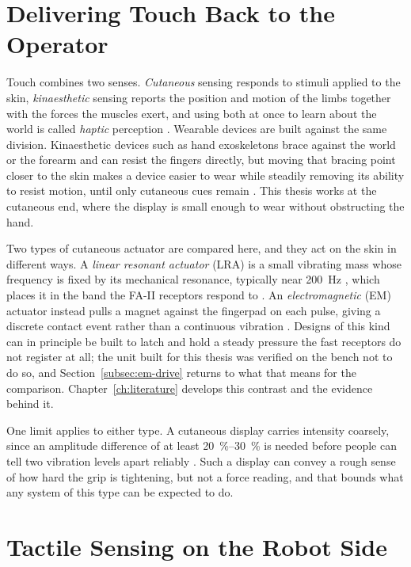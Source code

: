\documentclass[12pt, a4paper, twoside, openright]{report}
\begin{document}
\section{Delivering Touch Back to the Operator}
\label{sec:existing-approaches}

Touch combines two senses. \emph{Cutaneous} sensing
responds to stimuli applied to the skin, \emph{kinaesthetic} sensing reports
the position and motion of the limbs together with the forces the muscles
exert, and using both at once to learn about the world is called \emph{haptic}
perception \cite{howe1992}. Wearable devices are built against the same
division. Kinaesthetic devices such as hand exoskeletons brace against the
world or the forearm and can resist the fingers directly, but moving that
bracing point closer to the skin makes a device easier to wear while steadily
removing its ability to resist motion, until only cutaneous cues remain
\cite{pacchierotti2017}. This thesis works at the cutaneous end, where the
display is small enough to wear without obstructing the hand.

Two types of cutaneous actuator are compared here, and they act on the skin
in different ways. A \emph{linear resonant actuator} (LRA) is a small vibrating
mass whose frequency is fixed by its mechanical resonance, typically near
\SI{200}{\hertz} \cite{choi2013}, which places it in the band the FA-II
receptors respond to \cite{johansson2009}. An \emph{electromagnetic} (EM)
actuator instead pulls a magnet against the fingerpad on each pulse, giving a
discrete contact event rather than a continuous vibration
\cite{johansson2009,vechev2019}. Designs of this kind can in principle be
built to latch and hold a steady pressure the fast receptors do not register at
all; the unit built for this thesis was verified on the bench not to do so, and
Section~\ref{subsec:em-drive} returns to what that means for the comparison.
Chapter~\ref{ch:literature} develops this contrast and the evidence behind it.

One limit applies to either type. A cutaneous display carries intensity
coarsely, since an amplitude difference of at least \SIrange{20}{30}{\percent}
is needed before people can tell two vibration levels apart reliably
\cite{choi2013}. Such a display can convey a rough sense of how hard the grip
is tightening, but not a force reading, and that bounds what any system of this
type can be expected to do.

\section{Tactile Sensing on the Robot Side}
\label{sec:tactile-sensing}
\end{document}
